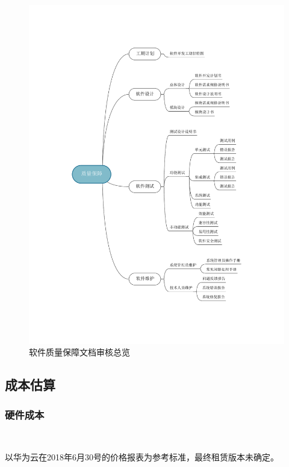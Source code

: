 \begin{figure}[H]
	\centering
	\includegraphics[width=0.9\columnwidth]{figures/software_quality_assurance}
	\caption{软件质量保障文档审核总览}
	\label{fg:software_quality_assurance}
\end{figure}

\subsection{成本估算}
\subsubsection{硬件成本}\

以华为云在2018年6月30号的价格报表为参考标准，最终租赁版本未确定。

